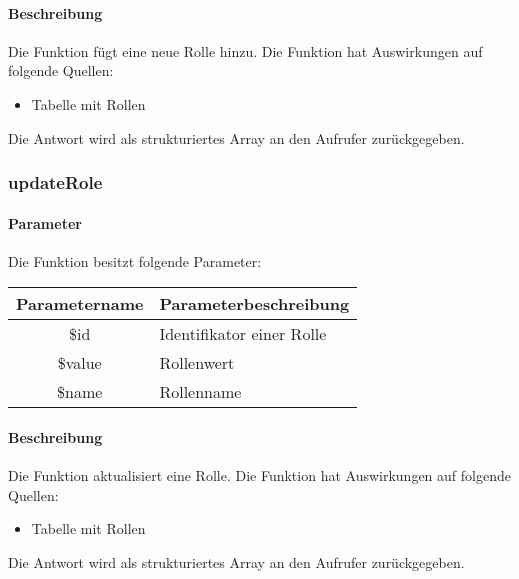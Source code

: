\paragraph{Beschreibung} Die Funktion fügt eine neue Rolle hinzu. Die Funktion hat Auswirkungen auf folgende Quellen:
\begin{itemize}
	\item Tabelle mit Rollen
\end{itemize}
Die Antwort wird als strukturiertes Array an den Aufrufer zurückgegeben.
\subsubsection{updateRole}
\paragraph{Parameter} Die Funktion besitzt folgende Parameter:
\begin{table}[H]
	\begin{tabular}{|c|p{11cm}|}
		\hline
		\textbf{Parametername} & \textbf{Parameterbeschreibung} \\ \hline
		\$id    & Identifikator einer Rolle \\ \hline
		\$value & Rollenwert \\ \hline
		\$name  & Rollenname \\ \hline
	\end{tabular}
\end{table}
\paragraph{Beschreibung} Die Funktion aktualisiert eine Rolle. Die Funktion hat Auswirkungen auf folgende Quellen:
\begin{itemize}
	\item Tabelle mit Rollen
\end{itemize}
Die Antwort wird als strukturiertes Array an den Aufrufer zurückgegeben.